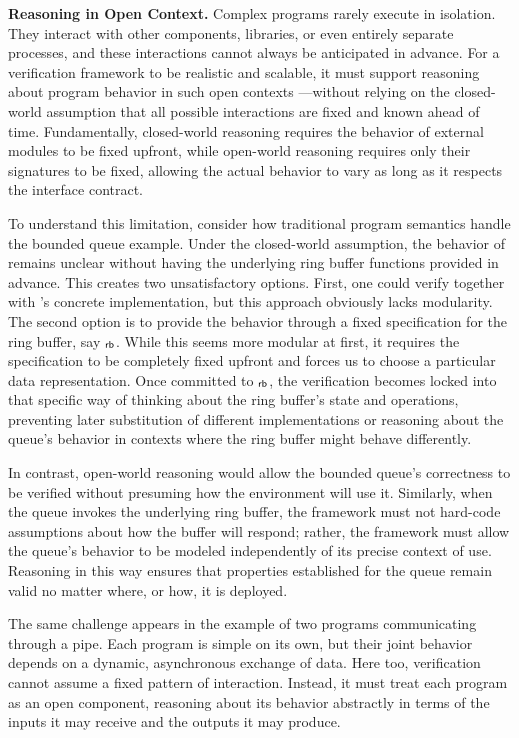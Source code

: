 \begin{challenge}
  \label{challenge:interaction}
  \textbf{Reasoning in Open Context.}
  Complex programs rarely execute in isolation.
  They interact with other components, libraries,
  or even entirely separate processes,
  and these interactions cannot always be anticipated
  in advance.
  For a verification framework to be realistic and scalable,
  it must support reasoning about program behavior
  in such open contexts%
  ---without relying on the closed-world assumption
  that all possible interactions are fixed
  and known ahead of time.
  Fundamentally, closed-world reasoning requires
  the behavior of external modules to be fixed upfront,
  while open-world reasoning requires only their signatures
  to be fixed,
  allowing the actual behavior to vary
  as long as it respects the interface contract.

  To understand this limitation,
  consider how traditional program semantics handle the bounded queue example.
  Under the closed-world assumption,
  the behavior of  remains unclear
  without having the underlying ring buffer functions provided in advance.
  This creates two unsatisfactory options.
  First, one could verify  together with
  's concrete implementation,
  but this approach obviously lacks modularity.
  The second option is to provide the behavior through
  a fixed specification for the ring buffer, say $_{ \mathsf{rb} }$.
  While this seems more modular at first,
  it requires the specification to be completely fixed upfront
  and forces us to choose a particular data representation.
  Once committed to $_{ \mathsf{rb} }$,
  the verification becomes locked into that specific way of thinking
  about the ring buffer's state and operations,
  preventing later substitution of different implementations
  or reasoning about the queue's behavior
  in contexts where the ring buffer might behave differently.

  In contrast, open-world reasoning would allow
  the bounded queue's correctness to be verified
  without presuming how the environment will use it.
  Similarly, when the queue invokes the underlying ring buffer,
  the framework must not hard-code assumptions
  about how the buffer will respond;
  rather, the framework must allow
  the queue's behavior to be modeled
  independently of its precise context of use.
  Reasoning in this way
  ensures that properties established
  for the queue remain valid no matter where, or how,
  it is deployed.

  The same challenge appears
  in the example of two programs communicating through a pipe.
  Each program is simple on its own,
  but their joint behavior
  depends on a dynamic, asynchronous exchange of data.
  Here too,
  verification cannot assume a fixed pattern of interaction.
  Instead,
  it must treat each program as an open component,
  reasoning about its behavior abstractly
  in terms of the inputs
  it may receive and the outputs it may produce.


\end{challenge}
